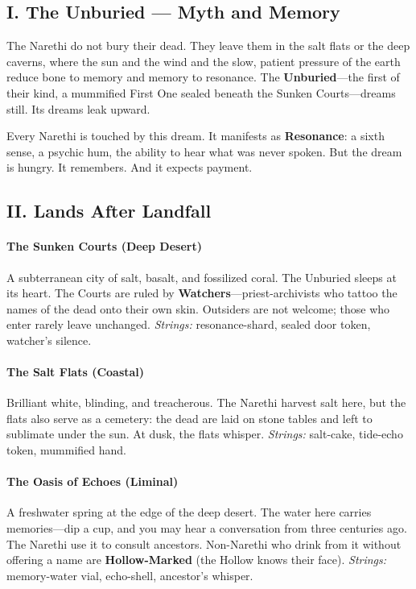 \documentclass[11pt]{article}
\begin{document}
\subsection*{I. The Unburied --- Myth and Memory}
The Narethi do not bury their dead. They leave them in the salt flats or the deep caverns, where the sun and the wind and the slow, patient pressure of the earth reduce bone to memory and memory to resonance. The \textbf{Unburied}---the first of their kind, a mummified First One sealed beneath the Sunken Courts---dreams still. Its dreams leak upward.

Every Narethi is touched by this dream. It manifests as \textbf{Resonance}: a sixth sense, a psychic hum, the ability to hear what was never spoken. But the dream is hungry. It remembers. And it expects payment.

\subsection*{II. Lands After Landfall}
\paragraph{The Sunken Courts (Deep Desert)}
A subterranean city of salt, basalt, and fossilized coral. The Unburied sleeps at its heart. The Courts are ruled by \textbf{Watchers}---priest-archivists who tattoo the names of the dead onto their own skin. Outsiders are not welcome; those who enter rarely leave unchanged. \textit{Strings:} resonance-shard, sealed door token, watcher's silence.

\paragraph{The Salt Flats (Coastal)}
Brilliant white, blinding, and treacherous. The Narethi harvest salt here, but the flats also serve as a cemetery: the dead are laid on stone tables and left to sublimate under the sun. At dusk, the flats whisper. \textit{Strings:} salt-cake, tide-echo token, mummified hand.

\paragraph{The Oasis of Echoes (Liminal)}
A freshwater spring at the edge of the deep desert. The water here carries memories---dip a cup, and you may hear a conversation from three centuries ago. The Narethi use it to consult ancestors. Non-Narethi who drink from it without offering a name are \textbf{Hollow-Marked} (the Hollow knows their face). \textit{Strings:} memory-water vial, echo-shell, ancestor's whisper.
\end{document}
